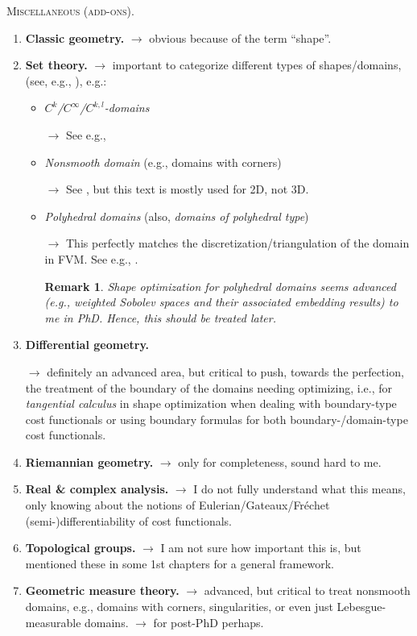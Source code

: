 \documentclass{book}
\numberwithin{equation}{section}
\newtheorem{remark}{Remark}[section]
\begin{document}
\begin{tcolorbox}
    \textsc{Miscellaneous (add-ons).}
    \begin{enumerate}
        \item \textbf{Classic geometry.} $\to$ obvious because of the term ``shape''.
        \item \textbf{Set theory.} $\to$ important to categorize different types of shapes/domains, (see, e.g., \cite{Delfour_Zolesio2011}), e.g.:
        \begin{itemize}
            \item \textit{$C^k$/$C^\infty$/$C^{k,l}$-domains}
            
            $\to$ See e.g., \cite{Delfour_Zolesio2011,Sokolowski_Zolesio1992}
            \item \textit{Nonsmooth domain} (e.g., domains with corners)
            
            $\to$ See \cite{Grisvard1985}, but this text is mostly used for 2D, not 3D.
            \item \textit{Polyhedral domains} (also, \textit{domains of polyhedral type}) 
            
            $\to$ This perfectly matches the discretization/triangulation of the domain in FVM. See e.g., \cite{Mazya_Rossmann2007,Mazya_Rossmann2009,Mazya_Rossmann2010}.
            
            \begin{remark}
                Shape optimization for polyhedral domains seems advanced (e.g., weighted Sobolev spaces and their associated embedding results) to me in PhD. Hence, this should be treated later.
            \end{remark}
        \end{itemize}
        \item \textbf{Differential geometry.}
        
        $\to$ definitely an advanced area, but critical to push, towards the perfection, the treatment of the boundary of the domains needing optimizing, i.e., for \textit{tangential calculus} in shape optimization when dealing with boundary-type cost functionals or using boundary formulas for both boundary-/domain-type cost functionals.
        \item \textbf{Riemannian geometry.} $\to$ only for completeness, sound hard to me.
        \item \textbf{Real \& complex analysis.} $\to$ I do not fully understand what this means, only knowing about the notions of Eulerian/Gateaux/Fr\'echet (semi-)differentiability of cost functionals.
        \item \textbf{Topological groups.} $\to$ I am not sure how important this is, but \cite{Delfour_Zolesio2011} mentioned these in some 1st chapters for a general framework.
        \item \textbf{Geometric measure theory.} $\to$ advanced, but critical to treat nonsmooth domains, e.g., domains with corners, singularities, or even just Lebesgue-measurable domains. $\to$ for post-PhD perhaps.
    \end{enumerate}
\end{tcolorbox}
\end{document}
